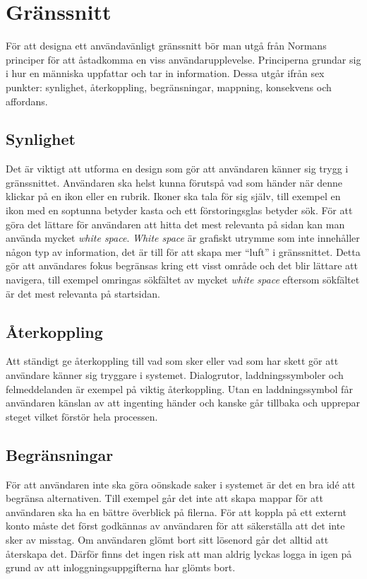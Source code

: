 \documentclass[a4paper,12pt,oneside,final]{extbook}
\begin{document}
\section{Gränssnitt}
För att designa ett användavänligt gränssnitt bör man utgå från Normans principer\cite{norman} för att åstadkomma en viss användarupplevelse. Principerna grundar sig i hur en människa uppfattar och tar in information. Dessa utgår ifrån sex punkter: synlighet, återkoppling, begränsningar, mappning, konsekvens och affordans.

\subsection{Synlighet}
Det är viktigt att utforma en design som gör att användaren känner sig trygg i gränssnittet. Användaren ska helst kunna förutspå vad som händer när denne klickar på en ikon eller en rubrik. Ikoner ska tala för sig själv, till exempel en ikon med en soptunna betyder kasta och ett förstoringsglas betyder sök. För att göra det lättare för användaren att hitta det mest relevanta på sidan kan man använda mycket \textit{white space}\cite{whitespace}. \textit{White space} är grafiskt utrymme som inte innehåller någon typ av information, det är till för att skapa mer “luft” i gränssnittet. Detta gör att användares fokus begränsas kring ett visst område och det blir lättare att navigera, till exempel omringas sökfältet av mycket \textit{white space} eftersom sökfältet är det mest relevanta på startsidan.

\subsection{Återkoppling}
Att ständigt ge återkoppling till vad som sker eller vad som har skett gör att användare känner sig tryggare i systemet. Dialogrutor, laddningssymboler och felmeddelanden är exempel på viktig återkoppling\cite{norman}. Utan en laddningssymbol får användaren känslan av att ingenting händer och kanske går tillbaka och upprepar steget vilket förstör hela processen.

\subsection{Begränsningar}
För att användaren inte ska göra oönskade saker i systemet är det en bra idé att begränsa alternativen\cite{norman}. Till exempel går det inte att skapa mappar för att användaren ska ha en bättre överblick på filerna. För att koppla på ett externt konto måste det först godkännas av användaren för att säkerställa att det inte sker av misstag. Om användaren glömt bort sitt lösenord går det alltid att återskapa det. Därför finns det ingen risk att man aldrig lyckas logga in igen på grund av att inloggningsuppgifterna har glömts bort.
\end{document}
